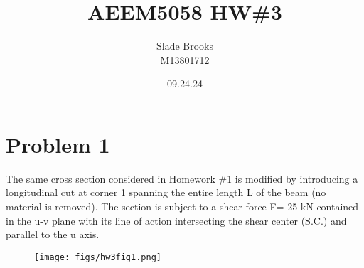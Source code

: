 \documentclass[12 pt]{article}
\title{AEEM5058 HW\#3}
\date{09.24.24}
\author{Slade Brooks \\ M13801712}
\begin{document}
\maketitle

\section*{Problem 1}
The same cross section considered in Homework \#1 is modified by introducing a longitudinal cut
at corner 1 spanning the entire length L of the beam (no material is removed). The section is
subject to a shear force F= 25 kN contained in the u-v plane with its line of action intersecting
the shear center (S.C.) and parallel to the u axis.
\begin{figure}[!hbtp]
    \centering
    \texttt{[image: figs/hw3fig1.png]}
\end{figure} \par

\pagebreak
\end{document}
